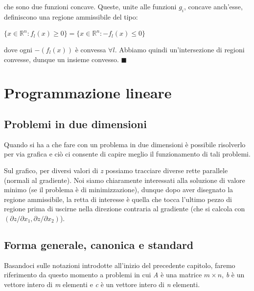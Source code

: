 \documentclass[11pt, oneside]{book}
\begin{document}
che sono due funzioni concave. Queste, unite alle funzioni $g_i$,
concave anch'esse, definiscono una regione ammissibile del tipo:

\begin{center}
$\{ x \in \mathbb{R}^n : f_l(x) \geq 0 \} = \{ x \in \mathbb{R}^n :
  -f_l(x) \leq 0 \}$
\end{center}

dove ogni $-(f_l(x))$ \`e convessa $\forall l$. Abbiamo quindi
un'intersezione di regioni convesse, dunque un insieme
convesso. $\blacksquare$


\chapter{Programmazione lineare}

\section{Problemi in due dimensioni}

Quando si ha a che fare con un problema in due dimensioni \`e
possibile risolverlo per via grafica e ci\`o ci consente di capire
meglio il funzionamento di tali problemi.

Sul grafico, per diversi valori di {\em z} possiamo tracciare diverse
rette parallele (normali al gradiente). Noi siamo chiaramente
interessati alla soluzione di valore minimo (se il problema \`e di
minimizzazione), dunque dopo aver disegnato la regione ammissibile, la
retta di interesse \`e quella che tocca l'ultimo pezzo di regione
prima di uscirne nella direzione contraria al gradiente (che si
calcola con $(\partial z / \partial x_1, \partial z / \partial x_2)$).

\section{Forma generale, canonica e standard}

Basandoci sulle notazioni introdotte all'inizio del precedente
capitolo, faremo riferimento da questo momento a problemi in cui {\em
  A} \`e una matrice $m \times n$, {\em b} \`e un vettore intero di
{\em m} elementi e {\em c} \`e un vettore intero di {\em n} elementi.

\par\bigskip
\end{document}
